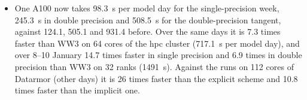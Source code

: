 \documentclass[11pt,a4paper]{article}
\begin{document}
\begin{itemize}
\begin{itemize}
times faster for two directions and 1.75 times for nine, and only if the
nodes per multiprocessor stayed the same, which the 11 to 15\,KB of
shared memory per further direction does not allow. Asynchronous outputs
are skipped (under 1\,\%).
\item One A100 now takes \SI{98.3}{s} per model day for the
single-precision week, \SI{245.3}{s} in double precision and
\SI{508.5}{s} for the double-precision tangent, against 124.1, 505.1 and
931.4 before. Over the same days it is 7.3 times faster than WW3 on 64
cores of the hpc cluster (\SI{717.1}{s} per model day), and over 8--10
January 14.7 times faster in single precision and 6.9 times in double
precision than WW3 on 32 ranks (\SI{1491}{s}). Against the runs on 112
cores of Datarmor (other days) it is 26 times faster than the explicit
scheme and 10.8 times faster than the implicit one.
\end{itemize}
\end{itemize}
\end{document}
